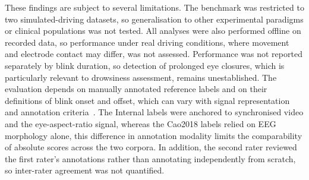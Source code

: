 These findings are subject to several limitations. The benchmark was restricted to two simulated-driving datasets, so generalisation to other experimental paradigms or clinical populations was not tested. All analyses were also performed offline on recorded data, so performance under real driving conditions, where movement and electrode contact may differ, was not assessed.
Performance was not reported separately by blink duration, so detection of prolonged eye closures, which is particularly relevant to drowsiness assessment, remains unestablished. The evaluation depends on manually annotated reference labels and on their definitions of blink onset and offset, which can vary with signal representation and annotation criteria~\citep{nystrm2024what}. The Internal labels were anchored to synchronised video and the eye-aspect-ratio signal, whereas the Cao2018 labels relied on EEG morphology alone, this difference in annotation modality limits the comparability of absolute scores across the two corpora. In addition, the second rater reviewed the first rater's annotations rather than annotating independently from scratch, so inter-rater agreement was not quantified.
